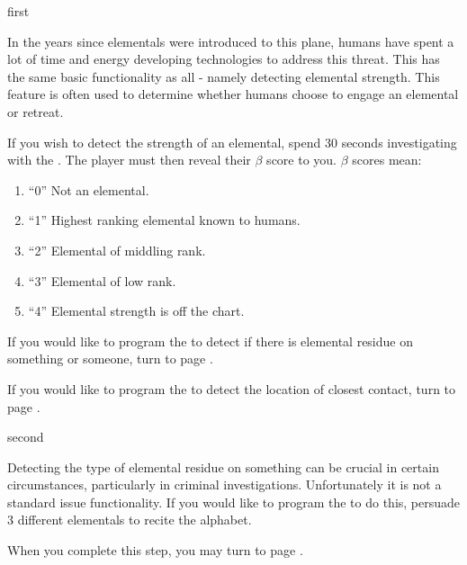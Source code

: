 \documentclass[notebook]{elementals}
\begin{document}
\startnotebook{\nTricorder{}}

\begin{page}{first}

In the years since elementals were introduced to this plane, humans have spent a lot of time and energy developing technologies to address this threat. This \iTricorder{} has the same basic functionality as all \iTricorder{} - namely detecting elemental strength. This feature is often used to determine whether humans choose to engage an elemental or retreat.

If you wish to detect the strength of an elemental, spend 30 seconds investigating with the \iTricorder{}. The player must then reveal their $\beta$ score to you. $\beta$ scores mean:
\begin{enumerate}
  \item ``0'' Not an elemental.
  \item ``1'' Highest ranking elemental known to humans.
  \item ``2'' Elemental of middling rank.
  \item ``3'' Elemental of low rank.
  \item ``4'' Elemental strength is off the chart.

\end{enumerate}

If you would like to program the \iTricorder{} to detect if there is elemental residue on something or someone, turn to page .

If you would like to program the \iTricorder{} to detect the location of closest contact, turn to page .

\end{page}

\begin{page}{second}

Detecting the type of elemental residue on something can be crucial in certain circumstances, particularly in criminal investigations. Unfortunately it is not a standard issue functionality. If you would like to program the \iTricorder{} to do this, persuade 3 different elementals to recite the alphabet.

When you complete this step, you may turn to page .

\end{page}
\end{document}

